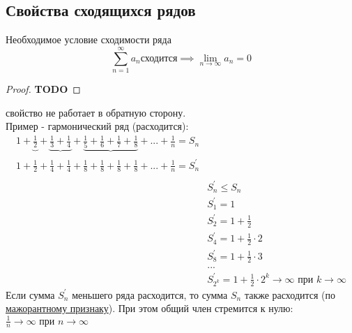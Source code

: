 \subsection{Свойства сходящихся рядов}
\begin{sv}
    \label{sv:neob}
    Необходимое условие сходимости ряда
    \begin{equation}
        \sum_{n=1}^{\infty} a_{n} \text{сходится}
        \implies \lim_{n\to\infty} a_{n} = 0
    \end{equation}

    \begin{proof}
        \color{YellowOrange}\textbf{TODO}
    \end{proof}

    \begin{remark}
        свойство не работает в обратную сторону. \\
        Пример - гармонический ряд (расходится): 
        \begin{equation}
            \begin{align*}
                1 
                + \underbrace{\frac{1}{2}}_{\text{}} 
                + \underbrace{\frac{1}{3} + \frac{1}{4}}_{\text{}} 
                + \underbrace{\frac{1}{5} + \frac{1}{6} + \frac{1}{7} + \frac{1}{8}}_{\text{}}
                + ... 
                + \frac{1}{n}
                = S_{n}
                \\
                1
                + \frac{1}{2}
                + \frac{1}{4} + \frac{1}{4}
                + \frac{1}{8} + \frac{1}{8} + \frac{1}{8} + \frac{1}{8}
                + ... 
                + \frac{1}{n}
                = S^{'}_{n}
                \\
                \\
                &S^{'}_{n} \leq S_{n}\\
                &S^{'}_{1} = 1\\
                &S^{'}_{2} = 1 + \frac{1}{2}\\
                &S^{'}_{4} = 1 + \frac{1}{2}\cdot 2\\
                &S^{'}_{8} = 1 + \frac{1}{2}\cdot 3\\
                &...
                \\
                &S^{'}_{2^{k}} = 1 + \frac{1}{2}\cdot 2^{k} \to\infty \text{ при } k\to\infty
            \end{align*}
        \end{equation}
        Если сумма \(S^{'}_{n}\) меньшего ряда расходится, то сумма \(S_{n}\) также расходится (по \hyperlink{priz:maj}{мажорантному признаку}). 
        При этом общий член стремится к нулю:
        \( \frac{1}{n}\to\infty \text{ при } n\to\infty \)
    \end{remark}
\end{sv}

